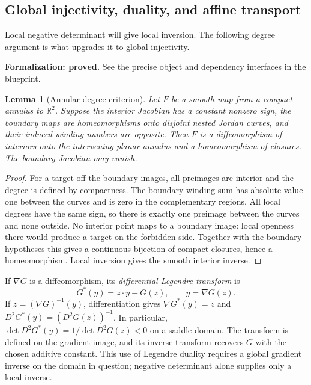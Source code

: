 \documentclass[11pt]{amsart}
\newtheorem{lemma}[theorem]{Lemma}
\theoremstyle{definition}
\theoremstyle{remark}
\newcommand{\R}{\mathbb R}\newcommand{\Sph}{\mathbb S}
\numberwithin{equation}{section}
\begin{document}
\subsection{Global injectivity, duality, and affine transport}
Local negative determinant will give local inversion. The following
degree argument is what upgrades it to global injectivity.
\par\noindent\textbf{Formalization: proved.} See the precise object and dependency interfaces in the blueprint.\par
\begin{lemma}[Annular degree criterion]\label{lem:degree}
Let $F$ be a smooth map from a compact annulus to $\R^2$. Suppose the
interior Jacobian has a constant nonzero sign, the boundary maps are
homeomorphisms onto disjoint nested Jordan curves, and their induced
winding numbers are opposite. Then $F$ is a diffeomorphism of interiors
onto the intervening planar annulus and a homeomorphism of closures.
The boundary Jacobian may vanish.
\end{lemma}
\begin{proof}
For a target off the boundary images, all preimages are interior and the
degree is defined by compactness. The boundary winding sum has absolute
value one between the curves and is zero in the complementary regions.
All local degrees have the same sign, so there is exactly one preimage
between the curves and none outside. No interior point maps to a boundary
image: local openness there would produce a target on the forbidden side.
Together with the boundary hypotheses this gives a continuous bijection
of compact closures, hence a homeomorphism. Local inversion gives the
smooth interior inverse.
\end{proof}

If $\nabla G$ is a diffeomorphism, its \emph{differential Legendre transform}
is
\[
 G^*(y)=z\cdot y-G(z),\qquad y=\nabla G(z).
\]
If $z=(\nabla G)^{-1}(y)$, differentiation gives
$\nabla G^*(y)=z$ and $D^2G^*(y)=(D^2G(z))^{-1}$.
In particular, $\det D^2G^*(y)=1/\det D^2G(z)<0$ on a saddle domain.
The transform is defined on the gradient image, and its inverse
transform recovers $G$ with the chosen additive constant. This use of
Legendre duality requires a global gradient inverse on the domain in
question; negative determinant alone supplies only a local inverse.
\end{document}
